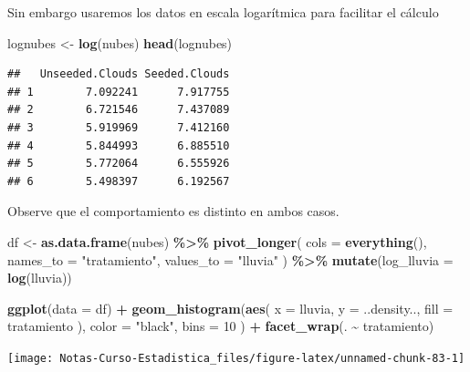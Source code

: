 \documentclass[
  12pt,
]{book}
\newenvironment{Shaded}{\begin{snugshade}}{\end{snugshade}}
\newcommand{\DataTypeTok}[1]{\textcolor[rgb]{0.13,0.29,0.53}{#1}}
\newcommand{\DecValTok}[1]{\textcolor[rgb]{0.00,0.00,0.81}{#1}}
\newcommand{\KeywordTok}[1]{\textcolor[rgb]{0.13,0.29,0.53}{\textbf{#1}}}
\newcommand{\NormalTok}[1]{#1}
\newcommand{\OperatorTok}[1]{\textcolor[rgb]{0.81,0.36,0.00}{\textbf{#1}}}
\newcommand{\StringTok}[1]{\textcolor[rgb]{0.31,0.60,0.02}{#1}}
\begin{document}
Sin embargo usaremos los datos en escala logarítmica para facilitar el cálculo

\begin{Shaded}
\begin{Highlighting}[]
\NormalTok{lognubes \textless{}{-}}\StringTok{ }\KeywordTok{log}\NormalTok{(nubes)}
\KeywordTok{head}\NormalTok{(lognubes)}
\end{Highlighting}
\end{Shaded}

\begin{verbatim}
##   Unseeded.Clouds Seeded.Clouds
## 1        7.092241      7.917755
## 2        6.721546      7.437089
## 3        5.919969      7.412160
## 4        5.844993      6.885510
## 5        5.772064      6.555926
## 6        5.498397      6.192567
\end{verbatim}

Observe que el comportamiento es distinto en ambos casos.

\begin{Shaded}
\begin{Highlighting}[]
\NormalTok{df \textless{}{-}}\StringTok{ }\KeywordTok{as.data.frame}\NormalTok{(nubes) }\OperatorTok{\%\textgreater{}\%}
\StringTok{  }\KeywordTok{pivot\_longer}\NormalTok{(}
    \DataTypeTok{cols =} \KeywordTok{everything}\NormalTok{(),}
    \DataTypeTok{names\_to =} \StringTok{"tratamiento"}\NormalTok{, }\DataTypeTok{values\_to =} \StringTok{"lluvia"}
\NormalTok{  ) }\OperatorTok{\%\textgreater{}\%}
\StringTok{  }\KeywordTok{mutate}\NormalTok{(}\DataTypeTok{log\_lluvia =} \KeywordTok{log}\NormalTok{(lluvia))}

\KeywordTok{ggplot}\NormalTok{(}\DataTypeTok{data =}\NormalTok{ df) }\OperatorTok{+}
\StringTok{  }\KeywordTok{geom\_histogram}\NormalTok{(}\KeywordTok{aes}\NormalTok{(}
    \DataTypeTok{x =}\NormalTok{ lluvia,}
    \DataTypeTok{y =}\NormalTok{ ..density..,}
    \DataTypeTok{fill =}\NormalTok{ tratamiento}
\NormalTok{  ),}
  \DataTypeTok{color =} \StringTok{"black"}\NormalTok{, }\DataTypeTok{bins =} \DecValTok{10}
\NormalTok{  ) }\OperatorTok{+}
\StringTok{  }\KeywordTok{facet\_wrap}\NormalTok{(. }\OperatorTok{\textasciitilde{}}\StringTok{ }\NormalTok{tratamiento)}
\end{Highlighting}
\end{Shaded}

\begin{center}\texttt{[image: Notas-Curso-Estadistica\_files/figure-latex/unnamed-chunk-83-1]} \end{center}
\end{document}
